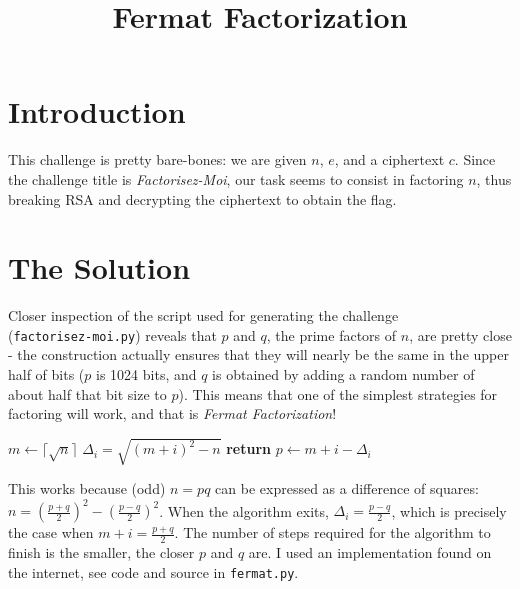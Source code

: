 \documentclass{article}
\title{Fermat Factorization}
\begin{document}
\maketitle

\section{Introduction}

This challenge is pretty bare-bones: we are given $n$, $e$, and a ciphertext $c$. Since the challenge title is \emph{Factorisez-Moi}, our task seems to consist in factoring $n$, thus breaking RSA and decrypting the ciphertext to obtain the flag.

\section{The Solution}

Closer inspection of the script used for generating the challenge \\ (\texttt{factorisez-moi.py}) reveals that $p$ and $q$, the prime factors of $n$, are pretty close - the construction actually ensures that they will nearly be the same in the upper half of bits ($p$ is 1024 bits, and $q$ is obtained by adding a random number of about half that bit size to $p$). This means that one of the simplest strategies for factoring will work, and that is \emph{Fermat Factorization}!

\begin{algorithm}
    \begin{algorithmic}[1]
    \State $m \leftarrow \lceil \sqrt{n} \rceil$
    \State $\Delta_{i} = \sqrt{(m+i)^2 - n}$
        \State \textbf{return} $p \leftarrow m + i - \Delta_i$
    \EndIf
    \EndFor
    \end{algorithmic}\label{algo}
\end{algorithm}

This works because (odd) $n=pq$ can be expressed as a difference of squares: $n = (\frac{p+q}{2})^2 - (\frac{p-q}{2})^2$. When the algorithm exits, $\Delta_{i} = \frac{p-q}{2}$, which is precisely the case when $m+i = \frac{p+q}{2}$. The number of steps required for the algorithm to finish is the smaller, the closer $p$ and $q$ are. I used an implementation found on the internet, see code and source in \texttt{fermat.py}.
\end{document}

